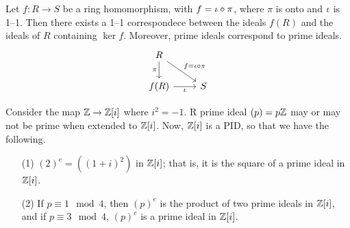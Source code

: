 \begin{lemma}\label{lemma_5.6.3}
    Let $f:R \xrightarrow{} S$ be a ring homomorphism, with $f=\iota \circ \pi$,
    where  $\pi$ is onto and  $\iota$ is 1--1. Then there exists a 1--1
    correspondece between the ideals $f(R)$ and the ideals of $R$ containing
     $\ker{f}$. Moreover, prime ideals correspond to prime ideals.
     \[\begin{tikzcd}
        R \\
        {f(R)} & S
        \arrow["\pi"', from=1-1, to=2-1]
        \arrow["\iota"', from=2-1, to=2-2]
        \arrow["{f=\iota \circ \pi}", from=1-1, to=2-2]
      \end{tikzcd}\]
\end{lemma}

\begin{example}\label{example_1.22}
    Consider the map $\mathbb{Z} \xrightarrow{} \mathbb{Z}[i]$ where $i^2=-1$. R prime ideal
    $(p)=p\mathbb{Z}$ may or may not be prime when extended to $\mathbb{Z}[i]$. Now, $\mathbb{Z}[i]$ is
        a PID, so that we have the following.
        \begin{enumerate}
            \item[(1)] $(2)^e=((1+i)^2)$ in $\mathbb{Z}[i]$; that is, it is the square
                of a prime ideal in $\mathbb{Z}[i]$.

            \item[(2)] If $p \equiv 1 \mod{4}$, then $(p)^e$ is the product of
                two prime ideals in $\mathbb{Z}[i]$, and if $p \equiv 3 \mod{4}$,
                $(p)^e$ is a prime ideal in $\mathbb{Z}[i]$.
        \end{enumerate}
\end{example}

